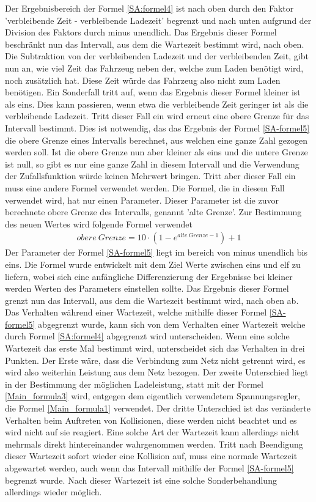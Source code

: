 Der Ergebnisbereich der Formel \ref{SA:formel4} ist nach oben durch den Faktor 'verbleibende Zeit - verbleibende Ladezeit' begrenzt und nach unten aufgrund der Division des Faktors durch minus unendlich. Das Ergebnis dieser Formel beschränkt nun das Intervall, aus dem die Wartezeit bestimmt wird, nach oben.  Die Subtraktion von der verbleibenden Ladezeit und der verbleibenden Zeit, gibt nun an, wie viel Zeit das Fahrzeug neben der, welche zum Laden benötigt wird, noch zusätzlich hat. Diese Zeit würde das Fahrzeug also nicht zum Laden benötigen. Ein Sonderfall tritt auf, wenn das Ergebnis dieser Formel kleiner ist als eins. Dies kann passieren, wenn etwa die verbleibende Zeit geringer ist als die verbleibende Ladezeit. Tritt dieser Fall ein wird erneut eine obere Grenze für das Intervall bestimmt. Dies ist notwendig, das das Ergebnis der Formel \ref{SA-formel5} die obere Grenze eines Intervalls berechnet, aus welchen eine ganze Zahl gezogen werden soll. Ist die obere Grenze nun aber kleiner als eins und die untere Grenze ist null, so gibt es nur eine ganze Zahl in diesem Intervall und die Verwendung der Zufallsfunktion würde keinen Mehrwert bringen. Tritt aber dieser Fall ein muss eine andere Formel verwendet werden. Die Formel, die in diesem Fall verwendet wird, hat nur einen Parameter. Dieser Parameter ist die zuvor berechnete obere Grenze des Intervalls, genannt 'alte Grenze'. Zur Bestimmung des neuen Wertes wird folgende Formel verwendet \\
\begin{align}
	obere\ Grenze = 10 \cdot (1 - e^{alte\ Grenze - 1}) + 1
	\label{SA-formel5}
\end{align}
Der Parameter der Formel \ref{SA-formel5} liegt im bereich von minus unendlich bis eins. Die Formel wurde entwickelt mit dem Ziel Werte zwischen eins und elf zu liefern, wobei sich eine anfängliche Differenzierung der Ergebnisse bei kleiner werden Werten des Parameters einstellen sollte. Das Ergebnis dieser Formel grenzt nun das Intervall, aus dem die Wartezeit bestimmt wird, nach oben ab. Das Verhalten während einer Wartezeit, welche mithilfe dieser Formel \ref{SA-formel5} abgegrenzt wurde, kann sich von dem Verhalten einer Wartezeit welche durch Formel \ref{SA:formel4} abgegrenzt wird unterscheiden. Wenn eine solche Wartezeit das erste Mal bestimmt wird, unterscheidet sich das Verhalten in drei Punkten. Der Erste wäre, dass die Verbindung zum Netz nicht getrennt wird, es wird also weiterhin Leistung aus dem Netz bezogen. Der zweite Unterschied liegt in der Bestimmung der möglichen Ladeleistung, statt mit der Formel \ref{Main_formula3} wird, entgegen dem eigentlich verwendetem Spannungsregler, die Formel \ref{Main_formula1} verwendet. Der dritte Unterschied ist das veränderte Verhalten beim Auftreten von Kollisionen, diese werden nicht beachtet und es wird nicht auf sie reagiert. Eine solche Art der Wartezeit kann allerdings nicht mehrmals direkt hintereinander wahrgenommen werden. Tritt nach Beendigung dieser Wartezeit sofort wieder eine Kollision auf, muss eine normale Wartezeit abgewartet werden, auch wenn das Intervall mithilfe der Formel \ref{SA-formel5} begrenzt wurde. Nach dieser Wartezeit ist eine solche Sonderbehandlung allerdings wieder möglich.\\
